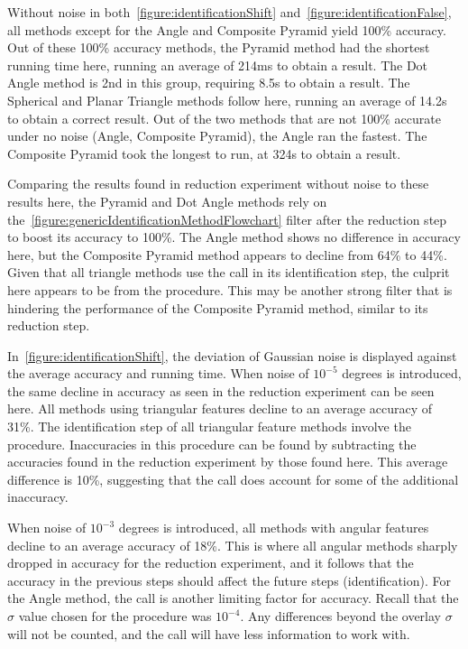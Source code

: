 Without noise in both~\autoref{figure:identificationShift} and~\autoref{figure:identificationFalse}, all methods except
for the Angle and Composite Pyramid yield 100\% accuracy.
Out of these 100\% accuracy methods, the Pyramid method had the shortest running time here, running an average of
214ms to obtain a result.
The Dot Angle method is 2nd in this group, requiring 8.5s to obtain a result.
The Spherical and Planar Triangle methods follow here, running an average of 14.2s to obtain a correct result.
Out of the two methods that are not 100\% accurate under no noise (Angle, Composite Pyramid), the Angle ran the fastest.
The Composite Pyramid took the longest to run, at 324s to obtain a result.

Comparing the results found in reduction experiment without noise to these results here, the Pyramid and Dot Angle
methods rely on the~\autoref{figure:genericIdentificationMethodFlowchart} filter after the reduction step to boost
its accuracy to 100\%.
The Angle method shows no difference in accuracy here, but the Composite Pyramid method appears to decline from 64\%
to 44\%.
Given that all triangle methods use the  call in its identification step, the culprit here appears to be
from the  procedure.
This may be another strong filter that is hindering the performance of the Composite Pyramid method, similar to its
reduction step.

In~\autoref{figure:identificationShift}, the deviation of Gaussian noise is displayed against the average accuracy and
running time.
When noise of $10^{-5}$ degrees is introduced, the same decline in accuracy as seen in the reduction experiment can be
seen here.
All methods using triangular features decline to an average accuracy of 31\%.
The identification step of all triangular feature methods involve the  procedure.
Inaccuracies in this procedure can be found by subtracting the accuracies found in the reduction
experiment by those found here.
This average difference is 10\%, suggesting that the  call does account for some of the additional
inaccuracy.

When noise of $10^{-3}$ degrees is introduced, all methods with angular features decline to an average accuracy of
18\%.
This is where all angular methods sharply dropped in accuracy for the reduction experiment, and it follows that the
accuracy in the previous steps should affect the future steps (identification).
For the Angle method, the  call is another limiting factor for accuracy.
Recall that the $\sigma$ value chosen for the  procedure was $10^{-4}$.
Any differences beyond the overlay $\sigma$ will not be counted, and the  call will have less
information to work with.

